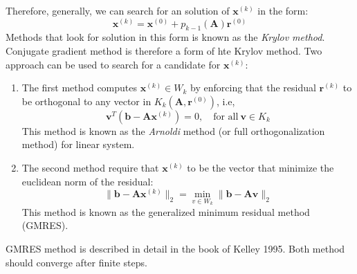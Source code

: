 \documentclass{article}
\begin{document}
Therefore, generally, we can search for an solution of $\mathbf{x}^{(k)}$ in the form:
\begin{equation}
    \mathbf{x}^{(k)} = \mathbf{x}^{(0)} + p_{k-1}(\mathbf{A}) \mathbf{r}^{(0)}
\end{equation}
Methods that look for solution in this form is known as the \emph{Krylov method}. 
Conjugate gradient method is therefore a form of hte Krylov method.
Two approach can be used to search for a candidate for $\mathbf{x}^{(k)}$:
\begin{enumerate}
    \item The first method computes $\mathbf{x}^{(k)}\in W_k$ by enforcing that the residual $\mathbf{r}^{(k)}$
    to be orthogonal to any vector in $K_{k}(\mathbf{A},\mathbf{r}^{(0)})$, i.e, 
    \begin{equation}
        \mathbf{v}^T \left( \mathbf{b} - \mathbf{A} \mathbf{x}^{(k)} \right) = 0
        ,\quad \text{for all}\ \mathbf{v} \in K_{k}
    \end{equation}
    This method is known as the \emph{Arnoldi} method (or full orthogonalization method) for linear system.
    \item The second method require that $\mathbf{x}^{(k)}$ to be the 
    vector that minimize the euclidean norm of the residual:
    \begin{equation}
        \|\mathbf{b} - \mathbf{A} \mathbf{x}^{(k)}\|_2 
        = \min_{v\in W_k} \|\mathbf{b} - \mathbf{A} \mathbf{v}\|_2
    \end{equation}
    This method is known as the generalized minimum residual method (GMRES). 
\end{enumerate}
GMRES method is described in detail in the book of Kelley 1995. 
Both method should converge after finite steps.
\end{document}
